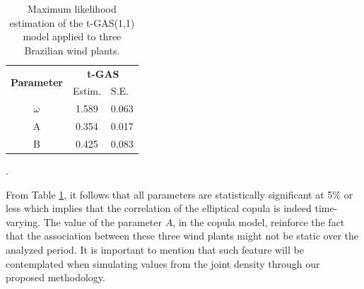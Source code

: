 \documentclass[a4paper]{IEEEtran}
\begin{document}
   
\begin{table}[htbp]
\centering
\caption{Maximum likelihood estimation of the t-GAS(1,1) model applied to three Brazilian wind plants.}
\label{my-label2}
\begin{tabular}{c|cc}
\hline
\multirow{2}{*}{{\bf Parameter}} & \multicolumn{2}{c}{{\bf t-GAS}}                       \\
                                 & \multicolumn{1}{l}{Estim.} & \multicolumn{1}{l}{S.E.} \\\hline
$\omega$                               & 1.589                      & 0.063                    \\
A                                & 0.354                      & 0.017                    \\
B                                & 0.425                      & 0.083                   \\\hline
\end{tabular}
\label{tab_3}.
\end{table}
   
From Table \ref{tab_3}, it follows that all parameters are statistically significant at 5\% or less which implies that the correlation of the elliptical copula is indeed time-varying. The value of the parameter $A$, in the copula model, reinforce the fact that the association between these three wind plants might not be static over the analyzed period. It is important to mention that such feature will be contemplated when simulating values from the joint density through our proposed methodology.%
   
%
%
   
\end{document}
